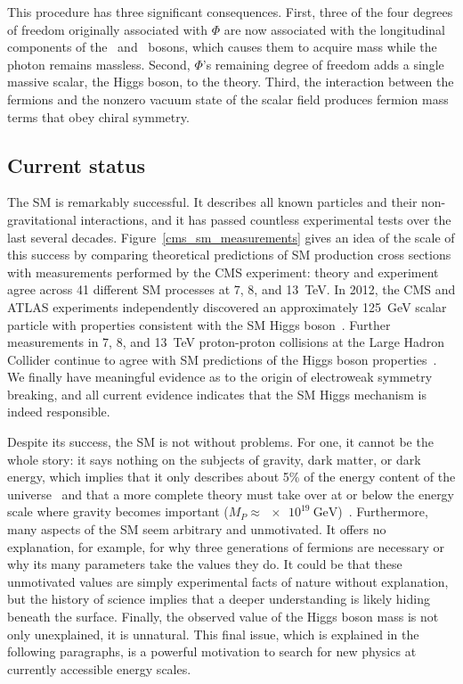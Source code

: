 This procedure has three significant consequences. First, three of the four degrees of freedom originally associated with $\Phi$ are now associated with the longitudinal components of the \PWpm\ and \cPZ\ bosons, which causes them to acquire mass while the photon remains massless. Second, $\Phi$'s remaining degree of freedom adds a single massive scalar, the Higgs boson, to the theory. Third, the interaction between the fermions and the nonzero vacuum state of the scalar field produces fermion mass terms that obey chiral symmetry.

\subsection{Current status}
\label{sm_status}
The SM is remarkably successful. It describes all known particles and their non-gravitational interactions, and it has passed countless experimental tests over the last several decades. Figure~\ref{cms_sm_measurements} gives an idea of the scale of this success by comparing theoretical predictions of SM production cross sections with measurements performed by the CMS experiment: theory and experiment agree across 41 different SM processes at \num{7}, \num{8}, and \SI{13}{\TeV}. In 2012, the CMS and ATLAS experiments  independently discovered an approximately \SI{125}{\GeV} scalar particle with properties consistent with the SM Higgs boson~\cite{cms_higgs, atlas_higgs}. Further measurements in \num{7}, \num{8}, and \SI{13}{\TeV} proton-proton collisions at the Large Hadron Collider continue to agree with SM predictions of the Higgs boson properties~\cite{cms_higgs_summary, atlas_higgs_summary}. We finally have meaningful evidence as to the origin of electroweak symmetry breaking, and all current evidence indicates that the SM Higgs mechanism is indeed responsible.



Despite its success, the SM is not without problems. For one, it cannot be the whole story: it says nothing on the subjects of gravity, dark matter, or dark energy, which implies that it only describes about 5\% of the energy content of the universe~\cite{fukugita_2004} and that a more complete theory must take over at or below the energy scale where gravity becomes important ($M_{P}\approx\SI{e19}{\GeV}$)~\cite{giudice_naturalness_2008}. Furthermore, many aspects of the SM seem arbitrary and unmotivated. It offers no explanation, for example, for why three generations of fermions are necessary or why its many parameters take the values they do. It could be that these unmotivated values are simply experimental facts of nature without explanation, but the history of science implies that a deeper understanding is likely hiding beneath the surface. Finally, the observed value of the Higgs boson mass is not only unexplained, it is unnatural. This final issue, which is explained in the following paragraphs, is a powerful motivation to search for new physics at currently accessible energy scales.

